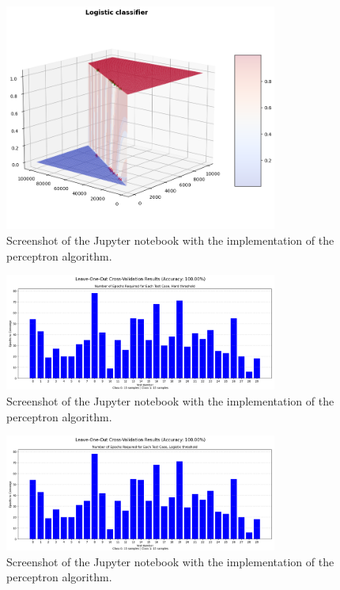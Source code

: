 \documentclass[a4paper]{article}
\begin{document}
\begin{figure}
    \centering
    \includegraphics[width=0.8\textwidth]{figures/logistic classifier.png}
    \caption{Screenshot of the Jupyter notebook with the implementation of the perceptron algorithm.}
    \label{fig:classifier_result_2}
\end{figure}


\begin{figure}
    \centering
    \includegraphics[width=0.8\textwidth]{figures/classifier result 1.png}
    \caption{Screenshot of the Jupyter notebook with the implementation of the perceptron algorithm.}
    \label{fig:classifier_result_1}
\end{figure}

\begin{figure}
    \centering
    \includegraphics[width=0.8\textwidth]{figures/classifier result 2.png}
    \caption{Screenshot of the Jupyter notebook with the implementation of the perceptron algorithm.}
    \label{fig:classifier_result_2}
\end{figure}
\end{document}
